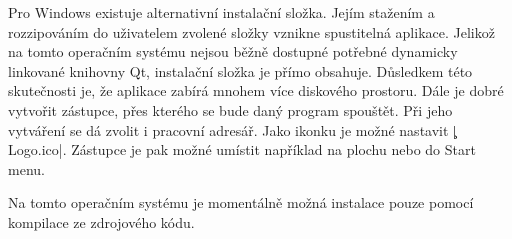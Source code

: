 Pro Windows existuje alternativní instalační složka. Jejím stažením a rozzipováním do uživatelem zvolené složky vznikne spustitelná aplikace. 
Jelikož na tomto operačním systému nejsou běžně dostupné potřebné dynamicky linkované knihovny Qt,
instalační složka je přímo obsahuje.
Důsledkem této skutečnosti je, že aplikace zabírá mnohem více diskového prostoru.
Dále je dobré vytvořit zástupce, přes kterého se bude daný program spouštět.
Při jeho vytváření se dá zvolit i pracovní adresář.
Jako ikonku je možné nastavit \c|Logo.ico|.
Zástupce je pak možné umístit například na plochu nebo do Start menu.

Na tomto operačním systému je momentálně možná instalace pouze pomocí kompilace ze zdrojového kódu.


